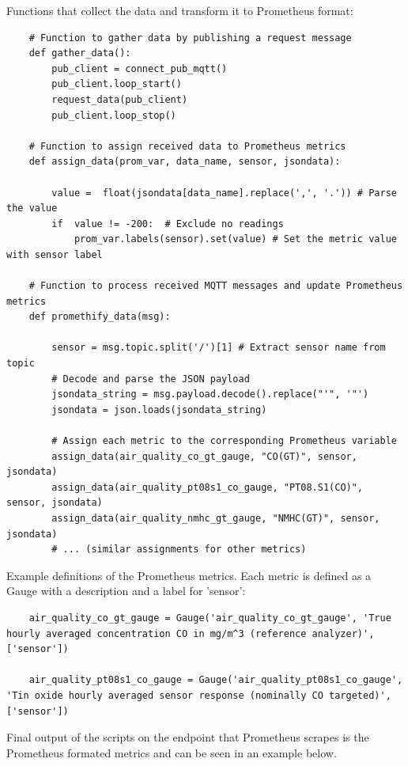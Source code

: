 Functions that collect the data and transform it to Prometheus format:
\begin{verbatim}
    # Function to gather data by publishing a request message
    def gather_data():
        pub_client = connect_pub_mqtt()
        pub_client.loop_start()
        request_data(pub_client)
        pub_client.loop_stop()

    # Function to assign received data to Prometheus metrics
    def assign_data(prom_var, data_name, sensor, jsondata):

        value =  float(jsondata[data_name].replace(',', '.')) # Parse the value
        if  value != -200:  # Exclude no readings
            prom_var.labels(sensor).set(value) # Set the metric value with sensor label  

    # Function to process received MQTT messages and update Prometheus metrics
    def promethify_data(msg):

        sensor = msg.topic.split('/')[1] # Extract sensor name from topic
        # Decode and parse the JSON payload
        jsondata_string = msg.payload.decode().replace("'", '"') 
        jsondata = json.loads(jsondata_string)

        # Assign each metric to the corresponding Prometheus variable
        assign_data(air_quality_co_gt_gauge, "CO(GT)", sensor, jsondata)
        assign_data(air_quality_pt08s1_co_gauge, "PT08.S1(CO)", sensor, jsondata)
        assign_data(air_quality_nmhc_gt_gauge, "NMHC(GT)", sensor, jsondata)
        # ... (similar assignments for other metrics)
\end{verbatim}

Example definitions of the Prometheus metrics. Each metric is defined as a Gauge with a description and a label for 'sensor':
\begin{verbatim}
    air_quality_co_gt_gauge = Gauge('air_quality_co_gt_gauge', 'True hourly averaged concentration CO in mg/m^3 (reference analyzer)', ['sensor'])

    air_quality_pt08s1_co_gauge = Gauge('air_quality_pt08s1_co_gauge', 'Tin oxide hourly averaged sensor response (nominally CO targeted)', ['sensor'])
\end{verbatim}

Final output of the scripts on the endpoint that Prometheus scrapes is the Prometheus formated metrics and can be seen in an example below.

